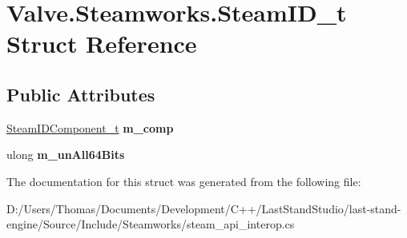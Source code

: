 \hypertarget{structValve_1_1Steamworks_1_1SteamID__t}{}\section{Valve.\+Steamworks.\+Steam\+I\+D\+\_\+t Struct Reference}
\label{structValve_1_1Steamworks_1_1SteamID__t}
\subsection*{Public Attributes}
\begin{DoxyCompactItemize}
\item 
\hypertarget{structValve_1_1Steamworks_1_1SteamID__t_a8f3937cb155cbf56466153f49f85ad54}{}\hyperlink{structValve_1_1Steamworks_1_1SteamIDComponent__t}{Steam\+I\+D\+Component\+\_\+t} {\bfseries m\+\_\+comp}\label{structValve_1_1Steamworks_1_1SteamID__t_a8f3937cb155cbf56466153f49f85ad54}

\item 
\hypertarget{structValve_1_1Steamworks_1_1SteamID__t_a8487ade5ab37425fa36103e8fabd1035}{}ulong {\bfseries m\+\_\+un\+All64\+Bits}\label{structValve_1_1Steamworks_1_1SteamID__t_a8487ade5ab37425fa36103e8fabd1035}

\end{DoxyCompactItemize}


The documentation for this struct was generated from the following file\+:\begin{DoxyCompactItemize}
\item 
D\+:/\+Users/\+Thomas/\+Documents/\+Development/\+C++/\+Last\+Stand\+Studio/last-\/stand-\/engine/\+Source/\+Include/\+Steamworks/steam\+\_\+api\+\_\+interop.\+cs\end{DoxyCompactItemize}
